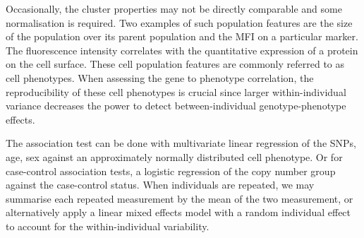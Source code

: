 %
%
%
%
%

Occasionally, the cluster properties may not be directly comparable and some normalisation is required.
Two examples of such population features are the size of the population over its parent population and the \gls{MFI} on a particular marker.
The fluorescence intensity correlates with the quantitative expression of a protein on the cell surface.
These cell population features are commonly referred to as cell phenotypes.  
When assessing the gene to phenotype correlation, the reproducibility of these cell phenotypes is crucial since
larger within-individual variance decreases the power to detect between-individual genotype-phenotype effects.

The association test can be done with multivariate linear regression of the SNPs, age, sex against an approximately normally distributed cell phenotype.
Or for case-control association tests, a logistic regression of the copy number group against the case-control status.
When individuals are repeated, we may summarise each repeated measurement by the mean of the two measurement, or
alternatively apply a linear mixed effects model with a random individual effect to account for the within-individual variability.

